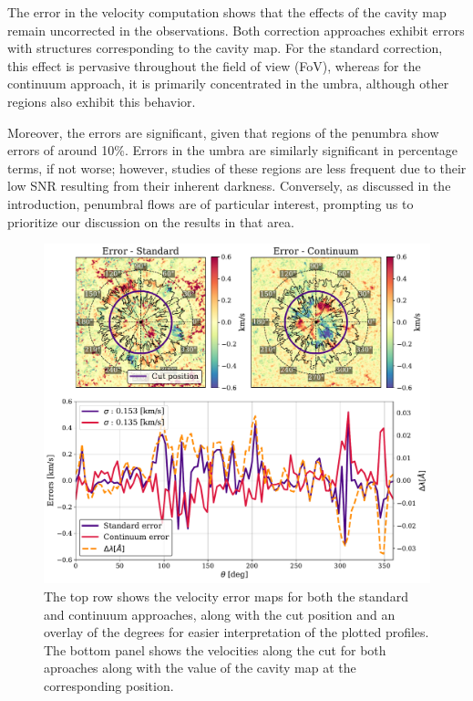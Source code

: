 The error in the velocity computation shows that the effects of the cavity map remain uncorrected in the observations. Both correction approaches exhibit errors with structures corresponding to the cavity map. For the standard correction, this effect is pervasive throughout the field of view (FoV), whereas for the continuum approach, it is primarily concentrated in the umbra, although other regions also exhibit this behavior.

Moreover, the errors are significant, given that regions of the penumbra show errors of around 10\%. Errors in the umbra are similarly significant in percentage terms, if not worse; however, studies of these regions are less frequent due to their low SNR resulting from their inherent darkness. Conversely, as discussed in the introduction, penumbral flows are of particular interest, prompting us to prioritize our discussion on the results in that area.

\begin{figure}
  \begin{minipage}[c]{0.7\textwidth}
    \includegraphics[width=\textwidth]{figures/Mancha/circular_cut_standard_cont.pdf}
  \end{minipage}\hfill\hfill
  \begin{minipage}[c]{0.27\textwidth}
    \caption{
      The top row shows the velocity error maps for both the standard and continuum approaches, along with the cut position and an overlay of the degrees for easier interpretation of the plotted profiles. The bottom panel shows the velocities along the cut for both aproaches along with the value of the cavity map at the corresponding position.\label{fig_mancha: verror_circular_cut}} 
  \end{minipage}
\end{figure}

